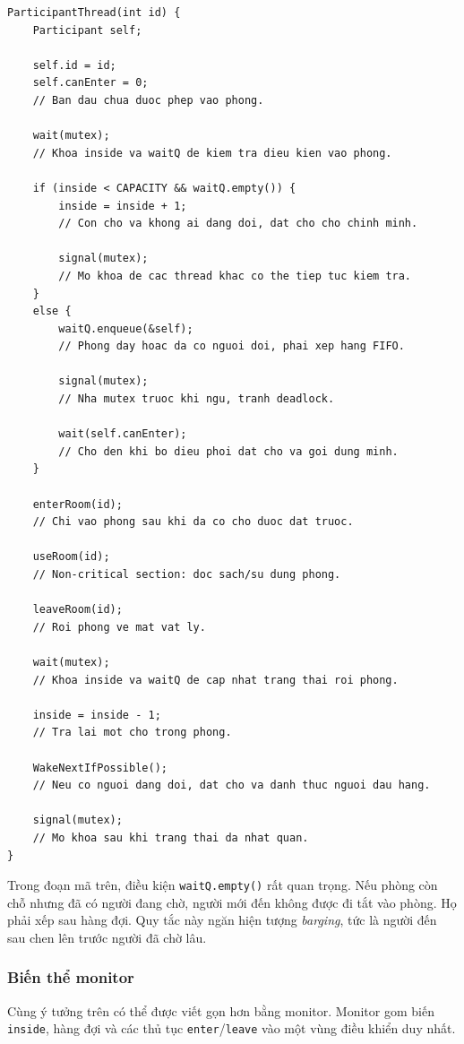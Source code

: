 \begin{lstlisting}
ParticipantThread(int id) {
    Participant self;

    self.id = id;
    self.canEnter = 0;
    // Ban dau chua duoc phep vao phong.

    wait(mutex);
    // Khoa inside va waitQ de kiem tra dieu kien vao phong.

    if (inside < CAPACITY && waitQ.empty()) {
        inside = inside + 1;
        // Con cho va khong ai dang doi, dat cho cho chinh minh.

        signal(mutex);
        // Mo khoa de cac thread khac co the tiep tuc kiem tra.
    }
    else {
        waitQ.enqueue(&self);
        // Phong day hoac da co nguoi doi, phai xep hang FIFO.

        signal(mutex);
        // Nha mutex truoc khi ngu, tranh deadlock.

        wait(self.canEnter);
        // Cho den khi bo dieu phoi dat cho va goi dung minh.
    }

    enterRoom(id);
    // Chi vao phong sau khi da co cho duoc dat truoc.

    useRoom(id);
    // Non-critical section: doc sach/su dung phong.

    leaveRoom(id);
    // Roi phong ve mat vat ly.

    wait(mutex);
    // Khoa inside va waitQ de cap nhat trang thai roi phong.

    inside = inside - 1;
    // Tra lai mot cho trong phong.

    WakeNextIfPossible();
    // Neu co nguoi dang doi, dat cho va danh thuc nguoi dau hang.

    signal(mutex);
    // Mo khoa sau khi trang thai da nhat quan.
}
\end{lstlisting}

Trong đoạn mã trên, điều kiện \texttt{waitQ.empty()} rất quan trọng. Nếu
phòng còn chỗ nhưng đã có người đang chờ, người mới đến không được đi tắt
vào phòng. Họ phải xếp sau hàng đợi. Quy tắc này ngăn hiện tượng
\textit{barging}, tức là người đến sau chen lên trước người đã chờ lâu.

\subsubsection*{Biến thể monitor}

Cùng ý tưởng trên có thể được viết gọn hơn bằng monitor. Monitor gom
biến \texttt{inside}, hàng đợi và các thủ tục \texttt{enter}/\texttt{leave}
vào một vùng điều khiển duy nhất.

